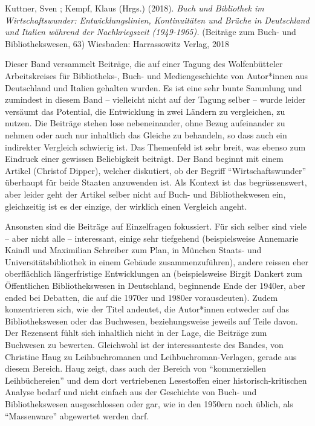 \documentclass[a4paper,
fontsize=11pt,
oneside,
numbers=noperiodatend,
parskip=half-,
bibliography=totoc,
final
]{scrartcl}
\begin{document}
Kuttner, Sven ; Kempf, Klaus (Hrgs.) (2018). \emph{Buch und Bibliothek
im Wirtschaftswunder: Entwicklungslinien, Kontinuitäten und Brüche in
Deutschland und Italien während der Nachkriegszeit (1949-1965).}
(Beiträge zum Buch- und Bibliothekswesen, 63) Wiesbaden: Harrassowitz
Verlag, 2018

Dieser Band versammelt Beiträge, die auf einer Tagung des Wolfenbütteler
Arbeitskreises für Bibliotheks-, Buch- und Mediengeschichte von
Autor*innen aus Deutschland und Italien gehalten wurden. Es ist eine
sehr bunte Sammlung und zumindest in diesem Band -- vielleicht nicht auf
der Tagung selber -- wurde leider versäumt das Potential, die
Entwicklung in zwei Ländern zu vergleichen, zu nutzen. Die Beiträge
stehen lose nebeneinander, ohne Bezug aufeinander zu nehmen oder auch
nur inhaltlich das Gleiche zu behandeln, so dass auch ein indirekter
Vergleich schwierig ist. Das Themenfeld ist sehr breit, was ebenso zum
Eindruck einer gewissen Beliebigkeit beiträgt. Der Band beginnt mit
einem Artikel (Christof Dipper), welcher diskutiert, ob der Begriff
\enquote{Wirtschaftswunder} überhaupt für beide Staaten anzuwenden ist.
Als Kontext ist das begrüssenswert, aber leider geht der Artikel selber
nicht auf Buch- und Bibliothekwesen ein, gleichzeitig ist es der
einzige, der wirklich einen Vergleich angeht.

Ansonsten sind die Beiträge auf Einzelfragen fokussiert. Für sich selber
sind viele -- aber nicht alle -- interessant, einige sehr tiefgehend
(beispielsweise Annemarie Kaindl und Maximilian Schreiber zum Plan, in
München Staats- und Universitätsbibliothek in einem Gebäude
zusammenzuführen), andere reissen eher oberflächlich längerfristige
Entwicklungen an (beispielsweise Birgit Dankert zum Öffentlichen
Bibliothekswesen in Deutschland, beginnende Ende der 1940er, aber ended
bei Debatten, die auf die 1970er und 1980er vorausdeuten). Zudem
konzentrieren sich, wie der Titel andeutet, die Autor*innen entweder auf
das Bibliothekswesen oder das Buchwesen, beziehungsweise jeweils auf
Teile davon. Der Rezensent fühlt sich inhaltlich nicht in der Lage, die
Beiträge zum Buchwesen zu bewerten. Gleichwohl ist der interessanteste
des Bandes, von Christine Haug zu Leihbuchromanen und
Leihbuchroman-Verlagen, gerade aus diesem Bereich. Haug zeigt, dass auch
der Bereich von \enquote{kommerziellen Leihbüchereien} und dem dort
vertriebenen Lesestoffen einer historisch-kritischen Analyse bedarf und
nicht einfach aus der Geschichte von Buch- und Bibliothekswesen
ausgeschlossen oder gar, wie in den 1950ern noch üblich, als
\enquote{Massenware} abgewertet werden darf.
\end{document}
